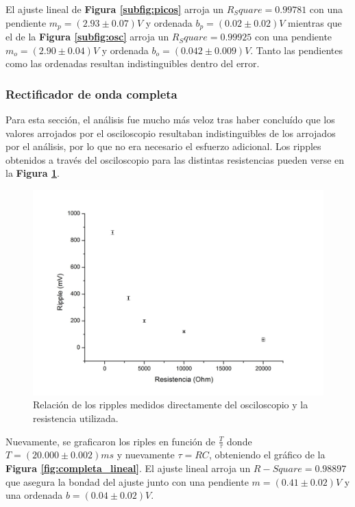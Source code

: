 \documentclass[11pt,a4paper]{article}
\begin{document}
El ajuste lineal de \textbf{Figura \ref{subfig:picos}} arroja un $R_Square = 0.99781$ con una pendiente $m_p = (2.93 \pm 0.07)V$ y ordenada $b_p = (0.02 \pm 0.02)V$ mientras que el de la \textbf{Figura \ref{subfig:osc}} arroja un $R_Square = 0.99925$ con una pendiente $m_o = (2.90 \pm 0.04)V$ y ordenada $b_o = (0.042 \pm 0.009)V$. Tanto las pendientes como las ordenadas resultan indistinguibles dentro del error. 


\subsubsection{Rectificador de onda completa}
Para esta sección, el análisis fue mucho más veloz tras haber concluído que los valores arrojados por el osciloscopio resultaban indistinguibles de los arrojados por el análisis, por lo que no era necesario el esfuerzo adicional. Los ripples obtenidos a través del osciloscopio para las distintas resistencias pueden verse en la \textbf{Figura \ref{fig:ripples_completa}}.

\begin{figure}[h]
\centering
\includegraphics[scale=0.18]{ripples_completa}
   \caption{Relación de los ripples medidos directamente del osciloscopio y la resistencia utilizada.}
   \label{fig:ripples_completa}
\end{figure}

Nuevamente, se graficaron los riples en función de $\frac{T}{\tau}$ donde $T = (20.000 \pm 0.002)ms$ y nuevamente $\tau = RC$, obteniendo el gráfico de la \textbf{Figura \ref{fig:completa_lineal}}. El ajuste lineal arroja un $R-Square = 0.98897$ que asegura la bondad del ajuste junto con una pendiente $m = (0.41 \pm 0.02)V$ y una ordenada $b = (0.04 \pm 0.02)V$. 
\end{document}

